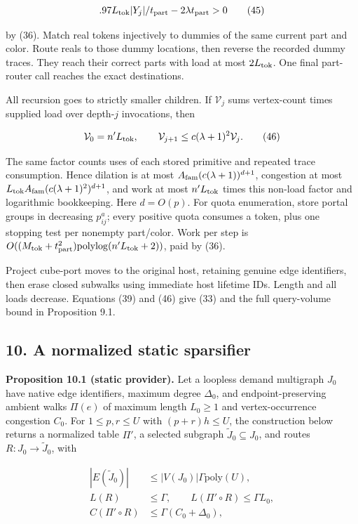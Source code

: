 \[
.97L_{\rm tok}|Y_j|/t_{\rm part}
                       -2\lambda t_{\rm part}>0
 \tag{45}
\]

by (36). Match real tokens injectively to dummies of the same current part and color. Route reals to those dummy locations, then reverse the recorded dummy traces. They reach their correct parts with load at most \(2L_{\rm tok}\). One final part-router call reaches the exact destinations.

All recursion goes to strictly smaller children. If \(\mathcal V_j\) sums vertex-count times supplied load over depth-\(j\) invocations, then

\[
\mathcal V_0=n'L_{\rm tok},\qquad
 \mathcal V_{j+1}\leq c(\lambda+1)^2\mathcal V_j.
 \tag{46}
\]

The same factor counts uses of each stored primitive and repeated trace consumption. Hence dilation is at most \(A_{\rm fam}(c(\lambda+1))^{d+1}\), congestion at most \(L_{\rm tok}A_{\rm fam}(c(\lambda+1)^2)^{d+1}\), and work at most \(n'L_{\rm tok}\) times this non-load factor and logarithmic bookkeeping. Here \(d=O(p)\). For quota enumeration, store portal groups in decreasing \(p_{ij}^a\); every positive quota consumes a token, plus one stopping test per nonempty part/color. Work per step is \(O((M_{\rm tok}+t_{\rm part}^2)\mathrm{polylog}(n'L_{\rm tok}+2))\), paid by (36).

Project cube-port moves to the original host, retaining genuine edge identifiers, then erase closed subwalks using immediate host lifetime IDs. Length and all loads decrease. Equations (39) and (46) give (33) and the full query-volume bound in Proposition 9.1.

\hypertarget{af-46593eb93e-a-normalized-static-sparsifier}{%
\subsection{10. A normalized static sparsifier}\label{af-46593eb93e-a-normalized-static-sparsifier}}

\textbf{Proposition 10.1 (static provider).} Let a loopless demand multigraph \(J_0\) have native edge identifiers, maximum degree \(\Delta_0\), and endpoint-preserving ambient walks \(\Pi(e)\) of maximum length \(L_0\geq1\) and vertex-occurrence congestion \(C_0\). For \(1\leq p,r\leq U\) with \((p+r)h\leq U\), the construction below returns a normalized table \(\Pi'\), a selected subgraph \(\widetilde J_0\subseteq J_0\), and routes \(R:J_0\to\widetilde J_0\), with

\[
\begin{aligned}
 |E(\widetilde J_0)|&\leq |V(J_0)|\Gamma\mathrm{poly}(U),\\
 L(R)&\leq\Gamma,\qquad L(\Pi'\circ R)\leq\Gamma L_0,\\
 C(\Pi'\circ R)&\leq\Gamma(C_0+\Delta_0),
\end{aligned}
 \tag{47}
\]

